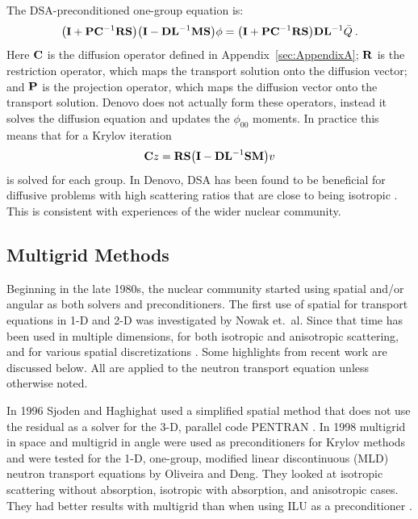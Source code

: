 The DSA-preconditioned one-group equation is:
%
\begin{equation}
  \bigl(\mathbf{I} + \mathbf{PC}^{-1}\mathbf{RS}\bigr) \bigl(\mathbf{I} - \mathbf{DL}^{-1}\mathbf{MS}\bigr) \phi = \bigl(\mathbf{I} + \mathbf{PC}^{-1}\mathbf{RS}\bigr)\mathbf{DL}^{-1}\bar{Q} \:. 
  \label{DSA1group}
\end{equation}
%
Here $\mathbf{C}$ is the diffusion operator defined in Appendix~\ref{sec:AppendixA}; $\mathbf{R}$ is the restriction operator, which maps the transport solution onto the diffusion vector; and $\mathbf{P}$ is the projection operator, which maps the diffusion vector onto the transport solution. Denovo does not actually form these operators, instead it solves the diffusion equation and updates the $\phi_{00}$ moments. In practice this means that for a Krylov iteration
%
\begin{equation}
  \mathbf{C}z = \mathbf{RS}\bigl(\mathbf{I} - \mathbf{DL}^{-1}\mathbf{SM}\bigr) v
\end{equation}
%
is solved for each group. In Denovo, DSA has been found to be beneficial for diffusive problems with high scattering ratios that are close to being isotropic \cite{Evans2009d}. This is consistent with experiences of the wider nuclear community.

\subsection{Multigrid Methods}
Beginning in the late 1980s, the nuclear community started using spatial \mg and/or angular \mg as both solvers and preconditioners. The first use of spatial \mg for transport equations in 1-D and 2-D was investigated by Nowak et.\ al. Since that time \mg has been used in multiple dimensions, for both isotropic and anisotropic scattering, and for various spatial discretizations \cite{Adams2002}. Some highlights from recent work are discussed below. All are applied to the \Sn neutron transport equation unless otherwise noted. 

In 1996 Sjoden and Haghighat used a simplified spatial \mg method that does not use the residual as a solver for the 3-D, parallel code PENTRAN \cite{Sjoden1996}. In 1998 multigrid in space and multigrid in angle were used as preconditioners for Krylov methods and were tested for the 1-D, one-group, modified linear discontinuous (MLD) neutron transport equations by Oliveira and Deng. They looked at isotropic scattering without absorption, isotropic with absorption, and anisotropic cases. They had better results with multigrid than when using ILU as a preconditioner \cite{Oliveira1998}.

